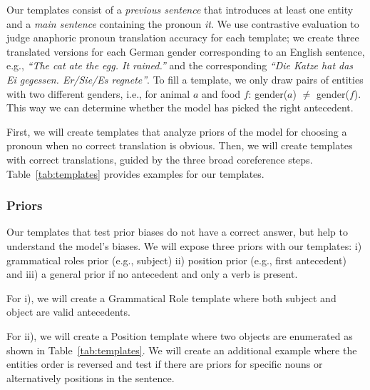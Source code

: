 Our templates consist of a \emph{previous sentence} that introduces at least one entity and a \emph{main sentence} containing the pronoun \emph{it}.
%
We use contrastive evaluation to judge anaphoric pronoun translation accuracy for each template; we create three translated versions for each German gender corresponding to an English sentence, e.g., \textit{``The cat ate the egg. It rained.''} and the corresponding \textit{``Die Katze hat das Ei gegessen. \emph{Er/Sie/Es} regnete''}.
%
To fill a template, we only draw pairs of entities with two different genders, i.e., for animal $a$ and food $f$: gender($a$) $\neq$ gender($f$). 
%
This way we can determine whether the model has picked the right antecedent.

First, we will create templates that analyze priors of
the model for choosing a pronoun when no correct translation is obvious. 
%
Then, we will create templates with correct translations, guided by the three broad coreference steps.
Table~\ref{tab:templates} provides examples for our templates.


\subsubsection{Priors}


Our templates that test prior biases do not have a correct answer, but help to understand the model's biases.
%
We will expose three priors with our templates: i) grammatical roles prior (e.g., subject)
ii) position prior  (e.g., first antecedent) and iii) a general prior if no antecedent and only a verb is present.

For i), we will create a Grammatical Role template where both subject and object are valid antecedents. 
%

For ii), we will create a Position template where two objects are enumerated as shown in Table~\ref{tab:templates}. 
%
We will create an additional example where the entities order is reversed and test if there are priors for specific nouns or alternatively positions in the sentence.  

